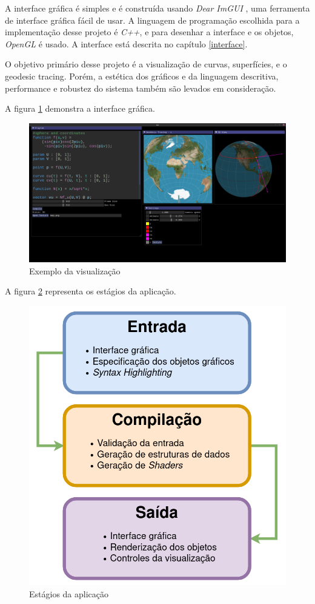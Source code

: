 A interface gráfica é simples e é construída usando \textit{Dear ImGUI} \cite{ImGui},
uma ferramenta de interface gráfica fácil de usar.
A linguagem de programação escolhida para a implementação desse projeto é \textit{C++},
e para desenhar a interface e os objetos, \textit{OpenGL} é usado.
A interface está descrita no capítulo \ref{interface}.

O objetivo primário desse projeto é a visualização de curvas, superfícies, e o geodesic tracing.
Porém, a estética dos gráficos e da linguagem descritiva, performance
e robustez do sistema também são levados em consideração.

A figura \ref{img:preview} demonstra a interface gráfica.

\begin{figure}[!ht]
    \includegraphics[width=\linewidth]{preview.png}
    \caption{Exemplo da visualização}
    \label{img:preview}
\end{figure}

A figura \ref{img:chart} representa os estágios da aplicação.

\begin{figure}[!ht]
    \includegraphics[width=\linewidth]{chart.png}
    \caption{Estágios da aplicação}
    \label{img:chart}
\end{figure}

